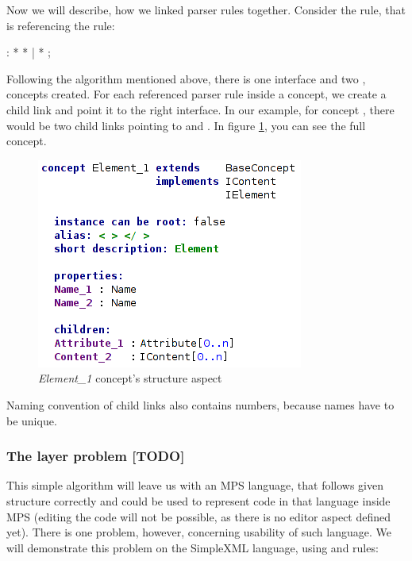 Now we will describe, how we linked parser rules together. 
Consider the  rule, that is referencing the  rule:

\begin{antlr}	
	    :   \literal{<}  * \literal{>} * \literal{</}  \literal{>}
           |   \literal{<}  * \literal{/>}
           ;
\end{antlr}

Following the algorithm mentioned above, there is one  interface and two ,  concepts created.
For each referenced parser rule inside a concept, we create a child link and point it to the right interface.
In our example, for concept , there would be two child links pointing to  and .
In figure \ref{fig:element_concept_full}, you can see the full  concept.

\begin{figure}[h]
	\centering
	\includegraphics[scale=0.7]{./img/element_concept_full.png}
	\caption{\textit{Element{\_}1} concept's structure aspect}
	\label{fig:element_concept_full}
\end{figure}

Naming convention of child links also contains numbers, because names have to be unique.

\subsubsection{The layer problem [TODO]}
\label{chap:layer_problem}

This simple algorithm will leave us with an MPS language, that follows given structure correctly and could be used to represent code in that language inside MPS (editing the code will not be possible, as there is no editor aspect defined yet).
There is one problem, however, concerning usability of such language.
We will demonstrate this problem on the SimpleXML language, using  and  rules:

